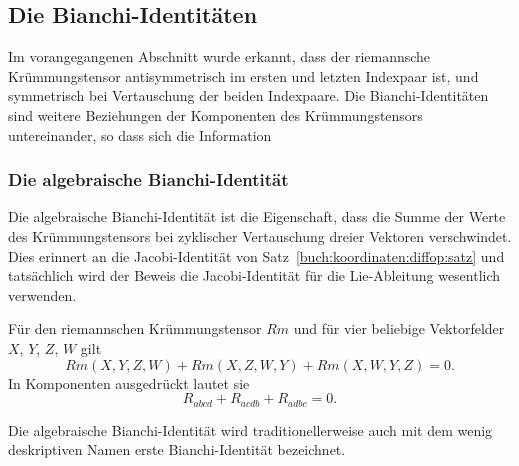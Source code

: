 %
%
\subsection{Die Bianchi-Identitäten}
Im vorangegangenen Abschnitt wurde erkannt, dass der riemannsche 
Krümmungstensor antisymmetrisch im ersten und letzten Indexpaar ist,
und symmetrisch bei Vertauschung der beiden Indexpaare.
Die Bianchi-Identitäten sind weitere Beziehungen der Komponenten
des Krümmungstensors untereinander, so dass sich die Information 

%
%
\subsubsection{Die algebraische Bianchi-Identität}
Die algebraische Bianchi-Identität ist die Eigenschaft, dass die
Summe der Werte des Krümmungstensors bei zyklischer Vertauschung
dreier Vektoren verschwindet.
Dies erinnert an die Jacobi-Identität von
Satz~\ref{buch:koordinaten:diffop:satz}
und tatsächlich wird der
Beweis die Jacobi-Identität für die Lie-Ableitung wesentlich
verwenden.

\begin{satz}
Für den riemannschen Krümmungstensor $\textit{Rm}$ und für vier beliebige
Vektorfelder $X$, $Y$, $Z$, $W$ gilt
\[
\textit{Rm}(X,Y,Z,W)
+
\textit{Rm}(X,Z,W,Y)
+
\textit{Rm}(X,W,Y,Z)
=
0.
\]
In Komponenten ausgedrückt lautet sie
\[
R_{abcd}
+
R_{acdb}
+
R_{adbc}
=
0.
\]
\end{satz}

Die algebraische Bianchi-Identität wird traditionellerweise auch
mit dem wenig deskriptiven Namen erste Bianchi-Identität bezeichnet.
%
%

